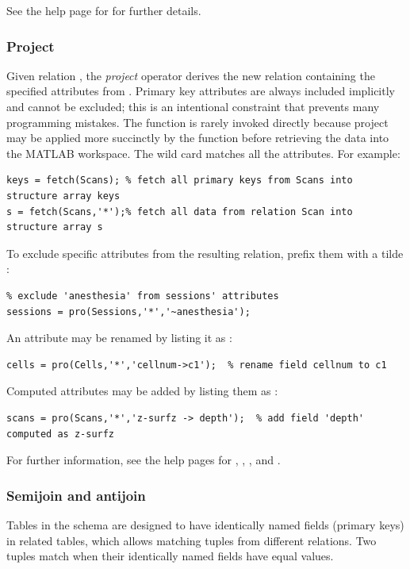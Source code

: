 \documentclass[10pt]{article}
\begin{document}
See the help page for  for further details.

\subsubsection{Project}
Given relation , the {\em project} operator  derives the new relation  containing the specified attributes from .  Primary key attributes are always included implicitly and cannot be excluded; this is an intentional constraint that prevents many programming mistakes. The function  is rarely invoked directly because project may be applied more succinctly by the  function before retrieving the data into the MATLAB workspace.  The wild card  matches all the attributes. For example:
\begin{lstlisting}
keys = fetch(Scans); % fetch all primary keys from Scans into structure array keys
s = fetch(Scans,'*');% fetch all data from relation Scan into structure array s
\end{lstlisting}



To exclude specific attributes from the resulting relation, prefix them with a tilde :
\begin{lstlisting}
% exclude 'anesthesia' from sessions' attributes
sessions = pro(Sessions,'*','~anesthesia');  
\end{lstlisting}

An attribute may be renamed by listing it as :
\begin{lstlisting}
cells = pro(Cells,'*','cellnum->c1');  % rename field cellnum to c1
\end{lstlisting}

Computed attributes may be added by listing them as :

\begin{lstlisting}
scans = pro(Scans,'*','z-surfz -> depth');  % add field 'depth' computed as z-surfz
\end{lstlisting}

For further information, see the help pages for , , , and .

\subsubsection{Semijoin and antijoin}
Tables in the schema are designed to have identically named fields (primary keys) in related tables, which allows matching tuples from different relations.  Two tuples match when their identically named fields have equal values.
\end{document}
